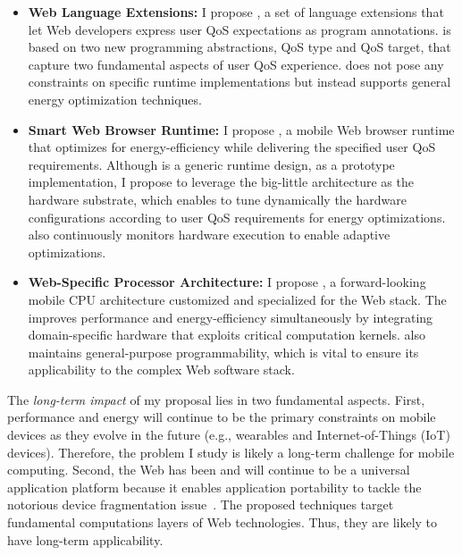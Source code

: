 \begin{itemize}
\item \textbf{Web Language Extensions:} I propose \greenweb, a set of language extensions that let Web developers express user QoS expectations as program annotations. \greenweb is based on two new programming abstractions, QoS type and QoS target, that capture two fundamental aspects of user QoS experience. \greenweb does not pose any constraints on specific runtime implementations but instead supports general energy optimization techniques.

\item \textbf{Smart Web Browser Runtime:} I propose \webrt, a  mobile Web browser runtime that optimizes for energy-efficiency while delivering the specified user QoS requirements. Although \webrt is a generic runtime design, as a prototype implementation, I propose to leverage the big-little architecture as the hardware substrate, which enables \webrt to tune dynamically the hardware configurations according to user QoS requirements for energy optimizations. \webrt also continuously monitors hardware execution to enable adaptive optimizations.

\item \textbf{Web-Specific Processor Architecture:} I propose \webcore, a forward-looking mobile CPU architecture customized and specialized for the Web stack. The \webcore improves performance and energy-efficiency simultaneously by integrating domain-specific hardware that exploits critical computation kernels. \webcore also maintains general-purpose programmability, which is vital to ensure its applicability to the complex Web software stack.
\end{itemize}

The \textit{long-term impact} of my proposal lies in two fundamental aspects.  First, performance and energy will continue to be the primary constraints on mobile devices as they evolve in the future (e.g., wearables and Internet-of-Things (IoT) devices). Therefore, the problem I study is likely a long-term challenge for mobile computing. Second, the Web has been and will continue to be a universal application platform because it enables application portability to tackle the notorious device fragmentation issue~\cite{fragmentation}. The proposed techniques target fundamental computations layers of Web technologies. Thus, they are likely to have long-term applicability.

